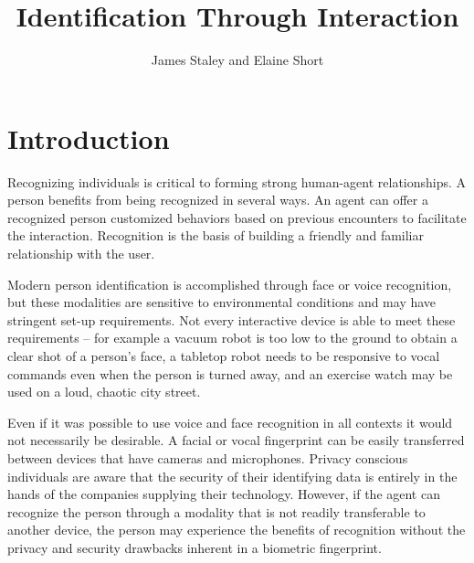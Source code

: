\documentclass[conference]{IEEEtran}
\title{Identification Through Interaction}
\author{James Staley and Elaine Short}
\date{\vspace{-1em}}
\newcommand{\elaine}[1]{{\textcolor[rgb]{0.1,0.4,0.6}{[ESS: {\it #1}]}}}
\begin{document}
\maketitle


\section{Introduction}

Recognizing individuals is critical to forming strong human-agent relationships. A person benefits from being recognized in several ways. An agent can offer a recognized person customized behaviors based on previous encounters to facilitate the interaction. Recognition is the basis of building a friendly and familiar relationship with the user.


Modern person identification is accomplished through face or voice recognition, but these modalities are sensitive to environmental conditions and may have stringent set-up requirements. Not every interactive device is able to meet these requirements -- for example a vacuum robot is too low to the ground to obtain a clear shot of a person's face, a tabletop robot needs to be responsive to vocal commands even when the person is turned away, and an exercise watch may be used on a loud, chaotic city street. 

Even if it was possible to use voice and face recognition in all contexts it would not necessarily be desirable. A facial or vocal fingerprint can be easily transferred between devices that have cameras and microphones. Privacy conscious individuals are aware that the security of their identifying data is entirely in the hands of the companies supplying their technology. However, if the agent can recognize the person through a modality that is not readily transferable to another device, the person may experience the benefits of recognition without the privacy and security drawbacks inherent in a biometric fingerprint. 
\end{document}

